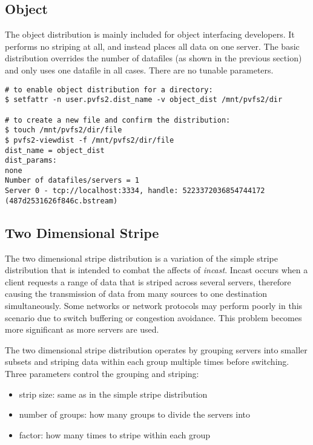 \documentclass[11pt,letterpaper]{article}
\begin{document}
\subsection{Object}

The object distribution is mainly included for object interfacing
developers.  It performs no striping at all, and instead places all
data on one server.  The basic distribution overrides the number of
datafiles (as shown in the previous section) and only uses one datafile
in all cases.  There are no tunable parameters.

\begin{verbatim}
# to enable object distribution for a directory:
$ setfattr -n user.pvfs2.dist_name -v object_dist /mnt/pvfs2/dir

# to create a new file and confirm the distribution:
$ touch /mnt/pvfs2/dir/file
$ pvfs2-viewdist -f /mnt/pvfs2/dir/file
dist_name = object_dist
dist_params:
none
Number of datafiles/servers = 1
Server 0 - tcp://localhost:3334, handle: 5223372036854744172 (487d2531626f846c.bstream)
\end{verbatim}


\subsection{Two Dimensional Stripe}

The two dimensional stripe distribution is a variation of the
simple stripe distribution that is intended to combat the affects of
\emph{incast}.  Incast occurs when a client requests a range of data that
is striped across several servers, therefore causing the transmission of
data from many sources to one destination simultaneously.  Some networks
or network protocols may perform poorly in this scenario due to switch
buffering or congestion avoidance.  This problem becomes more
significant as more servers are used.

The two dimensional stripe distribution operates by grouping servers
into smaller subsets and striping data within each group multiple times
before switching.  Three parameters control the grouping and
striping:

\begin{itemize}
\item strip size: same as in the simple stripe distribution
\item number of groups: how many groups to divide the servers into
\item factor: how many times to stripe within each group
\end{itemize}
\end{document}
